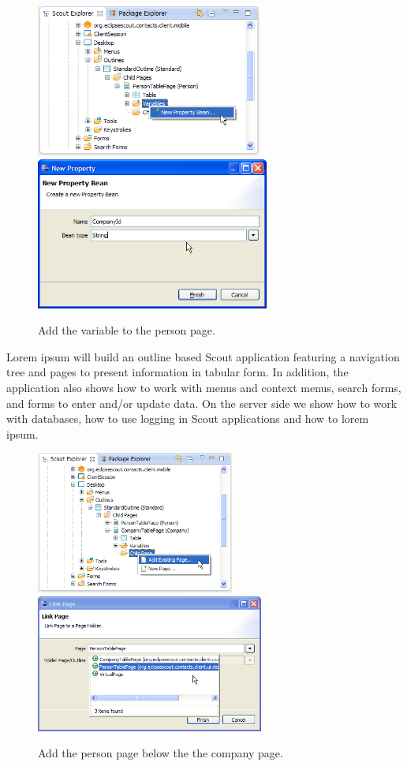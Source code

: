 \documentclass[a4paper,10pt,twoside]{book}
\begin{document}
\begin{figure}
\includegraphics[height=5cm]{new_bean_companyid_contextmenu.png} \hspace{5mm}
\includegraphics[height=5cm]{new_bean_companyid.png}
\caption{Add the  variable to the person page.}
\end{figure}

Lorem ipsum will build an outline based Scout application featuring a navigation tree and pages to present information in tabular form. 
In addition, the application also shows how to work with menus and context menus, search forms, and forms to enter and/or update data. 
On the server side we show how to work with databases, how to use logging in Scout applications and how to lorem ipsum. 

\begin{figure}
\includegraphics[width=6.5cm]{add_existing_page_contextmenu.png} \hspace{5mm}
\includegraphics[width=7.5cm]{add_existing_page.png}
\caption{Add the person page below the the company page.}
\end{figure}
\end{document}
